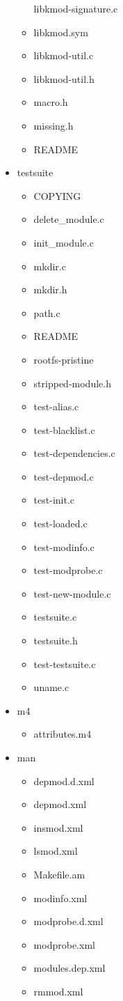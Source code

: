 \documentclass[11pt,a4paper]{article}
\begin{document}
\begin{itemize}
\begin{itemize}
    libkmod-signature.c
  \item
    libkmod.sym
  \item
    libkmod-util.c
  \item
    libkmod-util.h
  \item
    macro.h
  \item
    missing.h
  \item
    README
  \end{itemize}
\item
  testsuite
  \begin{itemize}
  \item
    COPYING
  \item
    delete\_module.c
  \item
    init\_module.c
  \item
    mkdir.c
  \item
    mkdir.h
  \item
    path.c
  \item
    README
  \item
    rootfs-pristine
  \item
    stripped-module.h
  \item
    test-alias.c
  \item
    test-blacklist.c
  \item
    test-dependencies.c
  \item
    test-depmod.c
  \item
    test-init.c
  \item
    test-loaded.c
  \item
    test-modinfo.c
  \item
    test-modprobe.c
  \item
    test-new-module.c
  \item
    testsuite.c
  \item
    testsuite.h
  \item
    test-testsuite.c
  \item
    uname.c
  \end{itemize}
\item
  m4
  \begin{itemize}
  \item
    attributes.m4
  \end{itemize}
\item
  man
  \begin{itemize}
  \item
    depmod.d.xml
  \item
    depmod.xml
  \item
    insmod.xml
  \item
    lsmod.xml
  \item
    Makefile.am
  \item
    modinfo.xml
  \item
    modprobe.d.xml
  \item
    modprobe.xml
  \item
    modules.dep.xml
  \item
    rmmod.xml
  \end{itemize}
\end{itemize}
\end{document}
